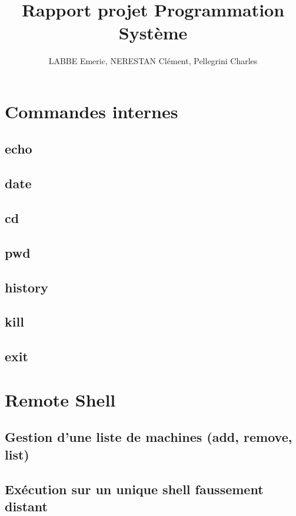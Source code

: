 \documentclass[12pt]{article}
\author{LABBE Emeric, NERESTAN Clément, Pellegrini Charles}
\title{Rapport projet Programmation Système}
\begin{document}
\maketitle
\tableofcontents

\newpage
\section{Commandes internes}

\subsection{echo}

\subsection{date}

\subsection{cd}

\subsection{pwd}

\subsection{history}

\subsection{kill}

\subsection{exit}

\newpage
\section{Remote Shell}
\subsection{Gestion d'une liste de machines (add, remove, list)}

\subsection{Exécution sur un unique shell faussement distant}
\end{document}
